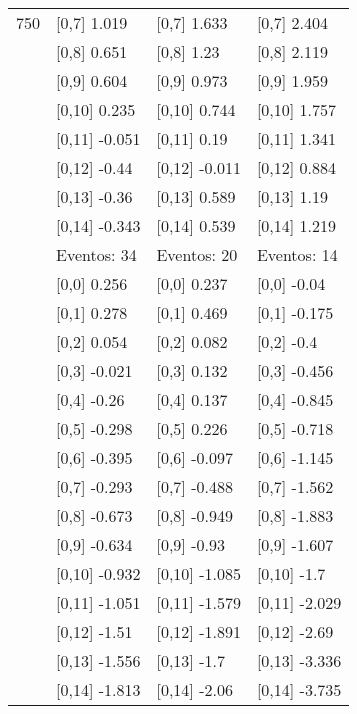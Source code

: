 \begin{table}
\begin{tabular}[t]{llll}
750 & {}[0,7] 1.019 & {}[0,7] 1.633 & {}[0,7] 2.404\\
\addlinespace
 & {}[0,8] 0.651 & {}[0,8] 1.23 & {}[0,8] 2.119\\
 & {}[0,9] 0.604 & {}[0,9] 0.973 & {}[0,9] 1.959\\
 & {}[0,10] 0.235 & {}[0,10] 0.744 & {}[0,10] 1.757\\
 & {}[0,11] -0.051 & {}[0,11] 0.19 & {}[0,11] 1.341\\
 & {}[0,12] -0.44 & {}[0,12] -0.011 & {}[0,12] 0.884\\
\addlinespace
 & {}[0,13] -0.36 & {}[0,13] 0.589 & {}[0,13] 1.19\\
 & {}[0,14] -0.343 & {}[0,14] 0.539 & {}[0,14] 1.219\\
 & Eventos:  34 & Eventos:  20 & Eventos:  14\\
 & {}[0,0] 0.256 & {}[0,0] 0.237 & {}[0,0] -0.04\\
 & {}[0,1] 0.278 & {}[0,1] 0.469 & {}[0,1] -0.175\\
\addlinespace
 & {}[0,2] 0.054 & {}[0,2] 0.082 & {}[0,2] -0.4\\
 & {}[0,3] -0.021 & {}[0,3] 0.132 & {}[0,3] -0.456\\
 & {}[0,4] -0.26 & {}[0,4] 0.137 & {}[0,4] -0.845\\
 & {}[0,5] -0.298 & {}[0,5] 0.226 & {}[0,5] -0.718\\
 & {}[0,6] -0.395 & {}[0,6] -0.097 & {}[0,6] -1.145\\
\addlinespace
1000 & {}[0,7] -0.293 & {}[0,7] -0.488 & {}[0,7] -1.562\\
 & {}[0,8] -0.673 & {}[0,8] -0.949 & {}[0,8] -1.883\\
 & {}[0,9] -0.634 & {}[0,9] -0.93 & {}[0,9] -1.607\\
 & {}[0,10] -0.932 & {}[0,10] -1.085 & {}[0,10] -1.7\\
 & {}[0,11] -1.051 & {}[0,11] -1.579 & {}[0,11] -2.029\\
\addlinespace
 & {}[0,12] -1.51 & {}[0,12] -1.891 & {}[0,12] -2.69\\
 & {}[0,13] -1.556 & {}[0,13] -1.7 & {}[0,13] -3.336\\
 & {}[0,14] -1.813 & {}[0,14] -2.06 & {}[0,14] -3.735\\
\bottomrule
\end{tabular}
\end{table}
